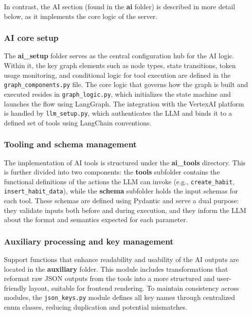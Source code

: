 \documentclass{article}
\begin{document}
In contrast, the AI section (found in the \textbf{ai} folder) is described in more detail below, as it implements the core logic of the server.

\subsubsection{AI core setup}

The \textbf{ai\_setup} folder serves as the central configuration hub for the AI logic.
Within it, the key graph elements such as node types, state transitions, token usage monitoring, and conditional logic for tool execution are defined in the \texttt{graph\_components.py} file.
The core logic that governs how the graph is built and executed resides in \texttt{graph\_logic.py}, which initializes the state machine and launches the flow using LangGraph.
The integration with the VertexAI platform is handled by \texttt{llm\_setup.py}, which authenticates the LLM and binds it to a defined set of tools using LangChain conventions.

\subsubsection{Tooling and schema management}

The implementation of AI tools is structured under the \textbf{ai\_tools} directory.
This is further divided into two components: the \textbf{tools} subfolder contains the functional definitions of the actions the LLM can invoke (e.g., \verb|create_habit|, \verb|insert_habit_data|), while the \textbf{schema} subfolder holds the input schemas for each tool.
These schemas are defined using Pydantic and serve a dual purpose: they validate inputs both before and during execution, and they inform the LLM about the format and semantics expected for each parameter.

\subsubsection{Auxiliary processing and key management}

Support functions that enhance readability and usability of the AI outputs are located in the \textbf{auxiliary} folder.
This module includes transformations that reformat raw JSON outputs from the tools into a more structured and user-friendly layout, suitable for frontend rendering.
To maintain consistency across modules, the \texttt{json\_keys.py} module defines all key names through centralized enum classes, reducing duplication and potential mismatches.
\end{document}
